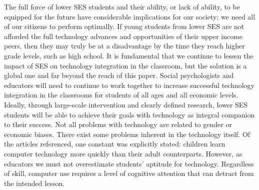 The full force of lower SES students and their ability, or lack of ability, to be equipped for the future have considerable implications for our society; we need all of our citizens to perform optimally. If young students from lower SES are not afforded the full technology advances and opportunities of their upper income peers, then they may truly be at a disadvantage by the time they reach higher grade levels, such as high school. It is fundamental that we continue to lessen the impact of SES on technology integration in the classroom, but the solution is a global one and far beyond the reach of this paper. Social psychologists and educators will need to continue to work together to increase successful technology integration in the classrooms for students of all ages and all economic levels.  Ideally, through large-scale intervention and clearly defined research, lower SES students will be able to achieve their goals with technology as integral companion to their success. 
Not all problems with technology are related to gender or economic biases.  There exist some problems inherent in the technology itself.  Of the articles referenced, one constant was explicitly stated: children learn computer technology more quickly than their adult counterparts.  However, as educators we must not overestimate students’ aptitude for technology.  Regardless of skill, computer use requires a level of cognitive attention that can detract from the intended lesson.  
